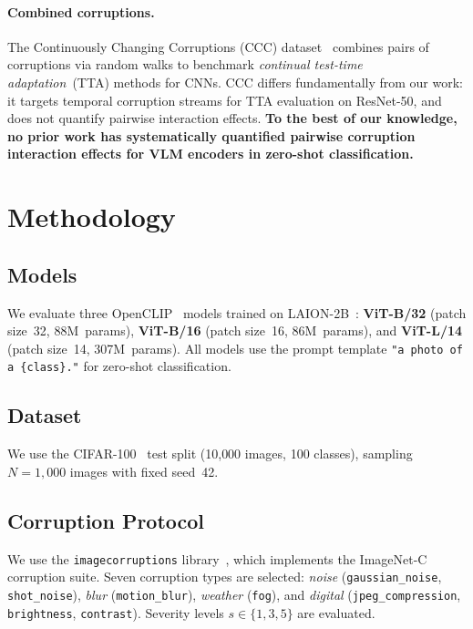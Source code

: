 \documentclass[10pt, twocolumn]{article}
\begin{document}
\paragraph{Combined corruptions.}
The Continuously Changing Corruptions (CCC)
dataset~\cite{press2023rdumb} combines pairs of corruptions
via random walks to benchmark \emph{continual test-time
adaptation}~(TTA) methods for CNNs.
CCC differs fundamentally from our work: it targets temporal
corruption streams for TTA evaluation on ResNet-50, and does
not quantify pairwise interaction effects.
\textbf{To the best of our knowledge, no prior work has
systematically quantified pairwise corruption interaction
effects for VLM encoders in zero-shot classification.}

\section{Methodology}
\label{sec:method}

\subsection{Models}
We evaluate three OpenCLIP~\cite{ilharco2021openclip}
models trained on LAION-2B~\cite{schuhmann2022laion}:
\textbf{ViT-B/32} (patch size~32, 88M~params),
\textbf{ViT-B/16} (patch size~16, 86M~params),
and \textbf{ViT-L/14} (patch size~14, 307M~params).
All models use the prompt template
\texttt{"a photo of a \{class\}."} for zero-shot
classification.

\subsection{Dataset}
We use the CIFAR-100~\cite{krizhevsky2009learning}
test split (10{,}000 images, 100 classes), sampling
$N=1{,}000$ images with fixed seed~42.

\subsection{Corruption Protocol}
We use the \texttt{imagecorruptions}
library~\cite{michaelis2019dragon}, which implements the
ImageNet-C corruption suite.
Seven corruption types are selected:
\textit{noise} (\texttt{gaussian\-\_noise},
\texttt{shot\-\_noise}),
\textit{blur} (\texttt{motion\-\_blur}),
\textit{weather} (\texttt{fog}), and
\textit{digital} (\texttt{jpeg\-\_compression},
\texttt{brightness}, \texttt{contrast}).
Severity levels $s \in \{1,3,5\}$ are evaluated.
\end{document}
